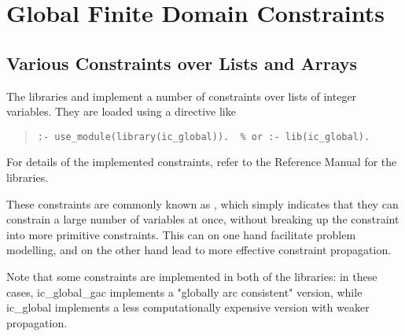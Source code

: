 %
% 
% 
% 
% 
%
%
%

\chapter{Global Finite Domain Constraints}
\label{chapglobconstr}
\section{Various Constraints over Lists and Arrays}

The libraries
and
implement a number of constraints over lists of integer variables.
They are loaded using a directive like
\begin{quote}\begin{verbatim}
:- use_module(library(ic_global)).	% or :- lib(ic_global).
\end{verbatim}\end{quote}
For details of the implemented constraints, refer to the Reference Manual
for the libraries.

These constraints are commonly known as ,
which simply indicates that they can constrain a large number of variables
at once, without breaking up the constraint into more primitive constraints.
This can on one hand facilitate problem modelling, and on the other hand
lead to more effective constraint propagation.

Note that some constraints are implemented in both of the libraries:
in these cases, ic_global_gac implements a "globally arc consistent"
version, while ic_global implements a less computationally expensive
version with weaker propagation.


